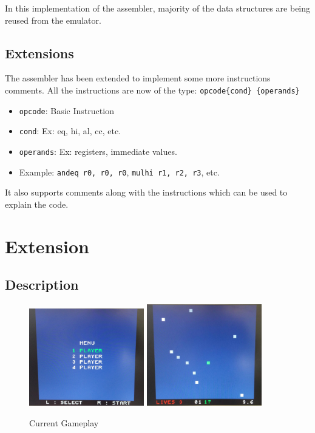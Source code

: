 \documentclass[11pt]{article}
\begin{document}
In this implementation of the assembler, majority of the data structures are
being reused from the emulator.

\newpage

\subsection{Extensions}

The assembler has been extended to implement some more instructions comments.
All the instructions are now of the type:
\texttt{opcode\{cond\} \{operands\}}
\begin{itemize}[noitemsep,topsep=0pt]
  \item \texttt{opcode}: Basic Instruction
  \item \texttt{cond}: Ex: eq, hi, al, cc, etc.
  \item \texttt{operands}: Ex: registers, immediate values.
  \item Example: \texttt{andeq r0, r0, r0}, \texttt{mulhi r1, r2, r3}, etc.
\end{itemize}

It also supports comments along with the instructions which can be used to
explain the code.

\section{Extension}

\subsection{Description}

\begin{figure}
  \caption{Current Gameplay}\label{wrap-fig:1}
  \includegraphics[width=5cm]{menu}
  \includegraphics[width=5cm]{screen}
\end{figure}
\end{document}
